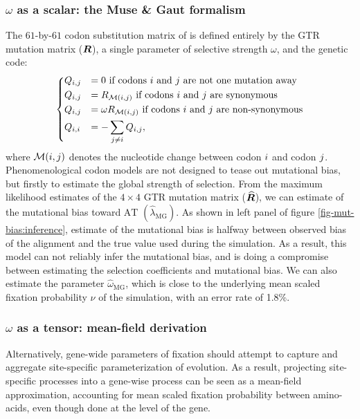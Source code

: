 \subsubsection{$\omega$ as a scalar: the Muse \& Gaut formalism}

The $61$-by-$61$ \gls{codon} \gls{substitution} matrix of \citet{Muse1994} is defined entirely by the GTR mutation matrix ($\bm{R}$), a single parameter of selective strength $\omega$, and the genetic code:
\begin{equation}
    \begin{dcases}
        Q_{{i}, {j}} & = 0 \text{ if codons ${i}$ and ${j}$ are not one mutation away} \\
        Q_{{i}, {j}} & = R_{\mathcal{M}({i}, {j})} \text{ if codons ${i}$ and ${j}$ are synonymous} \\
        Q_{{i}, {j}} & = \omega R_{\mathcal{M}({i}, {j})} \text{ if codons ${i}$ and ${j}$ are non-synonymous} \\
        Q_{{i}, {i}} & = - \sum\limits_{{j} \neq {i}} Q_{{i}, {j}},
    \end{dcases}
    \label{eq:codon-muse-gaut}
\end{equation}
where $\mathcal{M}({i}, {j})$ denotes the nucleotide change between codon ${i}$ and codon ${j}$.
Phenomenological \gls{codon} models are not designed to tease out mutational bias, but firstly to estimate the global strength of selection.
From the maximum \gls{likelihood} estimates of the $4 \times 4$ GTR mutation matrix ($\widehat{\bm{R}}$), we can estimate of the mutational bias toward $\mathrm{AT}$ $\left({\widehat{\lambda}_{\text{MG}}} \right)$.
As shown in left panel of figure \ref{fig-mut-bias:inference}, estimate of the mutational bias is halfway between observed bias of the alignment and the true value used during the simulation.
As a result, this model can not reliably infer the mutational bias, and is doing a compromise between estimating the selection coefficients and mutational bias.
We can also estimate the parameter ${\widehat{\omega}_{\text{MG}}}$, which is close to the underlying mean scaled fixation probability $\nu$ of the simulation, with an error rate of 1.8\%.

\subsubsection{$\omega$ as a tensor: mean-field derivation}

Alternatively, gene-wide parameters of fixation should attempt to capture and aggregate site-specific parameterization of evolution.
As a result, projecting site-specific processes into a gene-wise process can be seen as a mean-field approximation, accounting for mean scaled fixation probability between amino-acids, even though done at the level of the gene.

